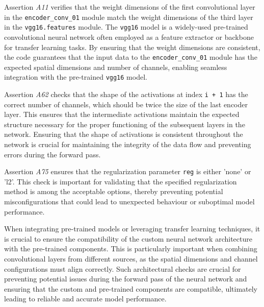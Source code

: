 Assertion \emph{A11} verifies that the weight dimensions of the first convolutional layer in the \lstinline{encoder_conv_01} module match the weight dimensions of the third layer in the \lstinline{vgg16.features} module. The \lstinline{vgg16} model is a widely-used pre-trained convolutional neural network often employed as a feature extractor or backbone for transfer learning tasks. By ensuring that the weight dimensions are consistent, the code guarantees that the input data to the \lstinline{encoder_conv_01} module has the expected spatial dimensions and number of channels, enabling seamless integration with the pre-trained \lstinline{vgg16} model.

Assertion \emph{A62} checks that the shape of the activations at index \lstinline{i + 1} has the correct number of channels, which should be twice the size of the last encoder layer. This ensures that the intermediate activations maintain the expected structure necessary for the proper functioning of the subsequent layers in the network. Ensuring that the shape of activations is consistent throughout the network is crucial for maintaining the integrity of the data flow and preventing errors during the forward pass.

Assertion \emph{A75} ensures that the regularization parameter \lstinline{reg} is either 'none' or 'l2'. This check is important for validating that the specified regularization method is among the acceptable options, thereby preventing potential misconfigurations that could lead to unexpected behaviour or suboptimal model performance.

When integrating pre-trained models or leveraging transfer learning techniques, it is crucial to ensure the compatibility of the custom neural network architecture with the pre-trained components. This is particularly important when combining convolutional layers from different sources, as the spatial dimensions and channel configurations must align correctly. Such architectural checks are crucial for preventing potential issues during the forward pass of the neural network and ensuring that the custom and pre-trained components are compatible, ultimately leading to reliable and accurate model performance.


